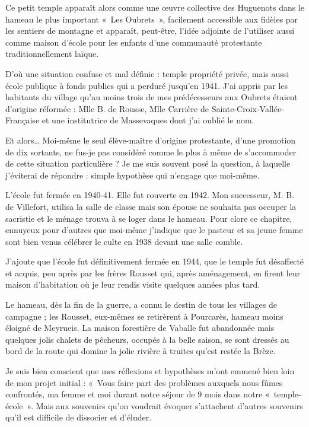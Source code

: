 Ce petit temple apparaît alors comme une œuvre collective des Huguenots dans le
hameau le plus important «~Les Oubrets~», facilement accessible aux fidèles par les
sentiers de montagne et apparaît, peut-être, l’idée adjointe de l’utiliser aussi
comme maison d’école pour les enfants d’une communauté protestante
traditionnellement laïque.

D’où une situation confuse et mal définie : temple propriété privée, mais aussi école
publique à fonds publics qui a perduré jusqu’en 1941.
J’ai appris par les habitants du village qu’au moins trois de mes prédécesseurs aux
Oubrets étaient d’origine réformée : Mlle B. de Rousse, Mlle Carrière de Sainte-Croix-Vallée-Française et une institutrice de Massevaques dont j’ai oublié le nom.

Et alors… Moi-même le seul élève-maître d’origine protestante, d’une promotion de
dix sortants, ne fus-je pas considéré comme le plus à même de s’accommoder de cette
situation particulière ? Je me suis souvent posé la question, à laquelle j’éviterai de
répondre : simple hypothèse qui n’engage que moi-même.

L’école fut fermée en 1940-41. Elle fut rouverte en 1942. Mon successeur, M. B. de
Villefort, utilisa la salle de classe mais son épouse ne souhaita pas occuper la sacristie
et le ménage trouva à se loger dans le hameau.
Pour clore ce chapitre, ennuyeux pour d’autres que moi-même j’indique que le
pasteur et sa jeune femme sont bien venus célébrer le culte en 1938 devant une salle
comble.

J’ajoute que l’école fut définitivement fermée en 1944, que le temple fut désaffecté et
acquis, peu après par les frères Rousset qui, après aménagement, en firent leur maison
d’habitation où je leur rendis visite quelques années plus tard.

Le hameau, dès la fin de la guerre, a connu le destin de tous les villages de
campagne ; les Rousset, eux-mêmes se retirèrent à Pourcarès, hameau moins éloigné
de Meyrueis. La maison forestière de Vaballe fut abandonnée mais quelques jolis
chalets de pêcheurs, occupés à la belle saison, se sont dressés au bord de la route qui
domine la jolie rivière à truites qu’est restée la Brèze.

Je suis bien conscient que mes réflexions et hypothèses m’ont emmené bien loin de
mon projet initial : «~Vous faire part des problèmes auxquels nous fûmes confrontés,
ma femme et moi durant notre séjour de 9 mois dans notre «~temple-école~». Mais aux
souvenirs qu’on voudrait évoquer s’attachent d’autres souvenirs qu’il est difficile de
dissocier et d’éluder.

